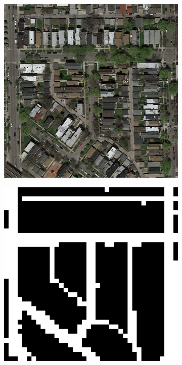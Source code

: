\documentclass[10pt,conference,compsocconf]{IEEEtran}
\begin{document}
\begin{figure}[htbp]
	\centering
	\begin{subfigure}[b]{0.15\textwidth}
		\includegraphics[width=\textwidth]{images/visualize_pred/test_10.png}
	\end{subfigure}
	\begin{subfigure}[b]{0.15\textwidth}
		\includegraphics[width=\textwidth]{images/visualize_pred/pred_10.png}

\end{subfigure}
\end{figure}
\end{document}
